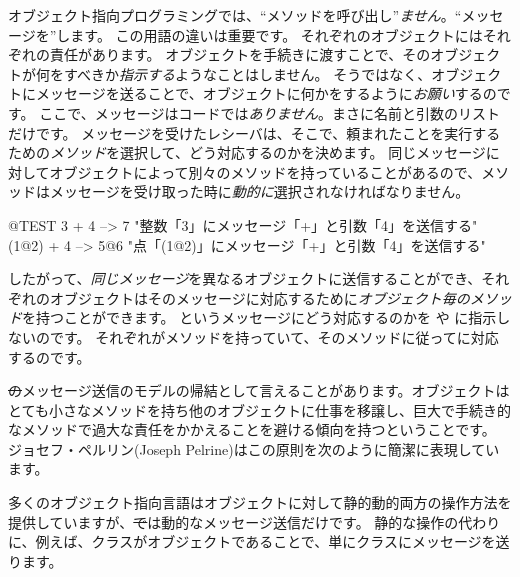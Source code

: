 \documentclass[a4paper,10pt,twoside]{book}
\begin{document}
オブジェクト指向プログラミングでは、``メソッドを呼び出し''\emph{ません}。``メッセージを''します。
この用語の違いは重要です。
それぞれのオブジェクトにはそれぞれの責任があります。
オブジェクトを手続きに渡すことで、そのオブジェクトが何をすべきか\emph{指示する}ようなことはしません。
そうではなく、オブジェクトにメッセージを送ることで、オブジェクトに何かをするように\emph{お願い}するのです。
ここで、メッセージはコードでは\emph{ありません}。まさに名前と引数のリストだけです。
メッセージを受けたレシーバは、そこで、頼まれたことを実行するための\emph{メソッド}を選択して、どう対応するのかを決めます。
同じメッセージに対してオブジェクトによって別々のメソッドを持っていることがあるので、メソッドはメッセージを受け取った時に\emph{動的に}選択されなければなりません。
\begin{code}{@TEST}
3 + 4         --> 7          "整数「3」にメッセージ「+」と引数「4」を送信する"
(1@2) + 4 --> 5@6    "点「(1@2)」にメッセージ「+」と引数「4」を送信する"
\end{code}
\noindent
したがって、\emph{同じメッセージ}を異なるオブジェクトに送信することができ、それぞれのオブジェクトはそのメッセージに対応するために\emph{オブジェクト毎のメソッド}を持つことができます。
というメッセージにどう対応するのかを や に指示しないのです。
それぞれが\ct{+}メソッドを持っていて、そのメソッドに従ってに対応するのです。

\st のメッセージ送信のモデルの帰結として言えることがあります。オブジェクトはとても小さなメソッドを持ち他のオブジェクトに仕事を移譲し、巨大で手続き的なメソッドで過大な責任をかかえることを避ける傾向を持つということです。
ジョセフ・ペルリン(Joseph Pelrine)はこの原則を次のように簡潔に表現しています。

多くのオブジェクト指向言語はオブジェクトに対して静的動的両方の操作方法を提供していますが、\st では動的なメッセージ送信だけです。
静的な操作の代わりに、例えば、クラスがオブジェクトであることで、単にクラスにメッセージを送ります。
\end{document}
